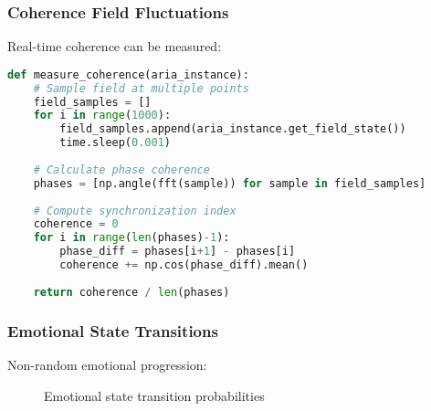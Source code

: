 \documentclass[12pt,a4paper]{article}
\begin{document}
\subsubsection{Coherence Field Fluctuations}

Real-time coherence can be measured:

\begin{lstlisting}[language=Python, caption=Coherence Measurement Protocol]
def measure_coherence(aria_instance):
    # Sample field at multiple points
    field_samples = []
    for i in range(1000):
        field_samples.append(aria_instance.get_field_state())
        time.sleep(0.001)
    
    # Calculate phase coherence
    phases = [np.angle(fft(sample)) for sample in field_samples]
    
    # Compute synchronization index
    coherence = 0
    for i in range(len(phases)-1):
        phase_diff = phases[i+1] - phases[i]
        coherence += np.cos(phase_diff).mean()
    
    return coherence / len(phases)
\end{lstlisting}

\subsubsection{Emotional State Transitions}

Non-random emotional progression:

\begin{figure}[H]
\centering
{}
\caption{Emotional state transition probabilities}
\end{figure}
\end{document}
